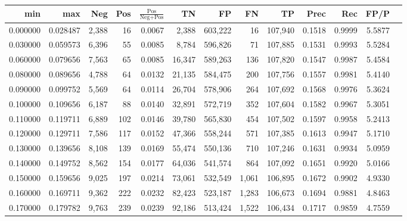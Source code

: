 \begin{tabular}{rrrrrrrrrrrrr}
\toprule
     min &      max &    Neg &   Pos & $\frac{\text{Pos}}{\text{Neg}+\text{Pos}}$ &      TN &      FP &      FN &      TP &   Prec &    Rec &   FP/P \\
\midrule
0.000000 & 0.028487 &  2,388 &    16 &                                     0.0067 &   2,388 & 603,222 &      16 & 107,940 & 0.1518 & 0.9999 & 5.5877 \\
0.030000 & 0.059573 &  6,396 &    55 &                                     0.0085 &   8,784 & 596,826 &      71 & 107,885 & 0.1531 & 0.9993 & 5.5284 \\
0.060000 & 0.079656 &  7,563 &    65 &                                     0.0085 &  16,347 & 589,263 &     136 & 107,820 & 0.1547 & 0.9987 & 5.4584 \\
0.080000 & 0.089656 &  4,788 &    64 &                                     0.0132 &  21,135 & 584,475 &     200 & 107,756 & 0.1557 & 0.9981 & 5.4140 \\
0.090000 & 0.099752 &  5,569 &    64 &                                     0.0114 &  26,704 & 578,906 &     264 & 107,692 & 0.1568 & 0.9976 & 5.3624 \\
0.100000 & 0.109656 &  6,187 &    88 &                                     0.0140 &  32,891 & 572,719 &     352 & 107,604 & 0.1582 & 0.9967 & 5.3051 \\
0.110000 & 0.119711 &  6,889 &   102 &                                     0.0146 &  39,780 & 565,830 &     454 & 107,502 & 0.1597 & 0.9958 & 5.2413 \\
0.120000 & 0.129711 &  7,586 &   117 &                                     0.0152 &  47,366 & 558,244 &     571 & 107,385 & 0.1613 & 0.9947 & 5.1710 \\
0.130000 & 0.139656 &  8,108 &   139 &                                     0.0169 &  55,474 & 550,136 &     710 & 107,246 & 0.1631 & 0.9934 & 5.0959 \\
0.140000 & 0.149752 &  8,562 &   154 &                                     0.0177 &  64,036 & 541,574 &     864 & 107,092 & 0.1651 & 0.9920 & 5.0166 \\
0.150000 & 0.159656 &  9,025 &   197 &                                     0.0214 &  73,061 & 532,549 &   1,061 & 106,895 & 0.1672 & 0.9902 & 4.9330 \\
0.160000 & 0.169711 &  9,362 &   222 &                                     0.0232 &  82,423 & 523,187 &   1,283 & 106,673 & 0.1694 & 0.9881 & 4.8463 \\
0.170000 & 0.179782 &  9,763 &   239 &                                     0.0239 &  92,186 & 513,424 &   1,522 & 106,434 & 0.1717 & 0.9859 & 4.7559 \\

\end{tabular}

